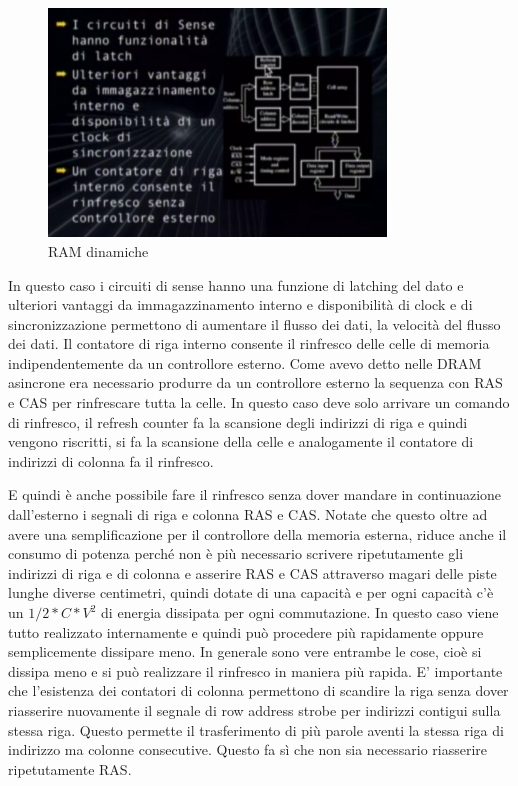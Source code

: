 \FloatBarrier
\begin{figure}[H]
  \centering
  \includegraphics[width=0.80\textwidth,
                    trim=0 0 0 0, %
                    clip]
                    {images/Lez04_p06_fig_01.png}
  \caption{RAM dinamiche}
  \label{fig:Lez04_p06_fig_01}
\end{figure}
\FloatBarrier
\noindent


In questo caso i circuiti di sense hanno una funzione di latching del dato e ulteriori vantaggi da immagazzinamento interno e disponibilità di clock e di sincronizzazione permettono di aumentare il flusso dei dati, la velocità del flusso dei dati.
Il contatore di riga interno consente il rinfresco delle celle di memoria indipendentemente da un controllore esterno.
Come avevo detto nelle DRAM asincrone era necessario produrre da un controllore esterno la sequenza con RAS e CAS per rinfrescare tutta la celle.
In questo caso deve solo arrivare un comando di rinfresco, il refresh counter fa la scansione degli indirizzi di riga e quindi vengono riscritti, si fa la scansione della celle e analogamente il contatore di indirizzi di colonna fa il rinfresco.

E quindi è anche possibile fare il rinfresco senza dover mandare in continuazione dall'esterno i segnali di riga e colonna RAS e CAS.
Notate che questo oltre ad avere una semplificazione per il controllore della memoria esterna, riduce anche il consumo di potenza perché non è più necessario scrivere ripetutamente gli indirizzi di riga e di colonna e asserire RAS e CAS attraverso magari delle piste lunghe diverse centimetri, quindi dotate di una capacità e per ogni capacità c'è un $1/2*C*V^2$ di energia dissipata per ogni commutazione.
In questo caso viene tutto realizzato internamente e quindi può procedere più rapidamente oppure semplicemente dissipare meno.
In generale sono vere entrambe le cose, cioè si dissipa meno e si può realizzare il rinfresco in maniera più rapida.
E' importante che l'esistenza dei contatori di colonna permettono di scandire la riga senza dover riasserire nuovamente il segnale di row address strobe per indirizzi contigui sulla stessa riga.
Questo permette il trasferimento di più parole aventi la stessa riga di indirizzo ma colonne consecutive.
Questo fa sì che non sia necessario riasserire ripetutamente RAS.


